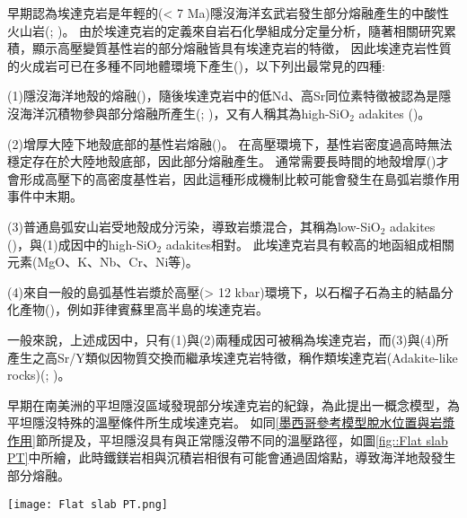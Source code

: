 早期認為埃達克岩是年輕的(< 7 Ma)隱沒海洋玄武岩發生部分熔融產生的中酸性火山岩(\citealp{defant1990derivation}; \citealp{peacock1994partial})。
由於埃達克岩的定義來自岩石化學組成分定量分析，隨著相關研究累積，顯示高壓變質基性岩的部分熔融皆具有埃達克岩的特徵，
因此埃達克岩性質的火成岩可已在多種不同地體環境下產生(\citealp{martin2005overview})，以下列出最常見的四種:

(1)隱沒海洋地殼的熔融(\citealp{defant1990derivation})，隨後埃達克岩中的低Nd、高Sr同位素特徵被認為是隱沒海洋沉積物參與部分熔融所產生(\citealp{stern1996role}; \citealp{gomez2003temporal})，又有人稱其為high-SiO$_2$ adakites (\citealp{martin2005overview})。

(2)增厚大陸下地殼底部的基性岩熔融(\citealp{kay1996magmatic})。
在高壓環境下，基性岩密度過高時無法穩定存在於大陸地殼底部，因此部分熔融產生。
通常需要長時間的地殼增厚(\citealp{kay2002magmatism})才會形成高壓下的高密度基性岩，因此這種形成機制比較可能會發生在島弧岩漿作用事件中末期。

(3)普通島弧安山岩受地殼成分污染，導致岩漿混合，其稱為low-SiO$_2$ adakites (\citealp{martin2005overview})，與(1)成因中的high-SiO$_2$ adakites相對。
此埃達克岩具有較高的地函組成相關元素(MgO、K、Nb、Cr、Ni等)。

(4)來自一般的島弧基性岩漿於高壓(> 12 kbar)環境下，以石榴子石為主的結晶分化產物(\citealp{moyen2009high})，例如菲律賓蘇里高半島的埃達克岩。

一般來說，上述成因中，只有(1)與(2)兩種成因可被稱為埃達克岩，而(3)與(4)所產生之高Sr/Y類似因物質交換而繼承埃達克岩特徵，稱作類埃達克岩(Adakite-like rocks)(\citealp{kay2002magmatism}; \citealp{goss2013andean})。

早期在南美洲的平坦隱沒區域發現部分埃達克岩的紀錄，\citealp{Gutscher2000Bcan}為此提出一概念模型，為平坦隱沒特殊的溫壓條件所生成埃達克岩。
如同\ref{墨西哥參考模型脫水位置與岩漿作用}節所提及，平坦隱沒具有與正常隱沒帶不同的溫壓路徑，如圖\ref{fig::Flat slab PT}中所繪，此時鐵鎂岩相與沉積岩相很有可能會通過固熔點，導致海洋地殼發生部分熔融。

\begin{figure*}[ht!]
    \centering
    \texttt{[image: Flat slab PT.png]}
    \caption[隱沒板塊頂部可能的溫壓路徑圖，摘自\citealp{Gutscher2000Bcan}]{隱沒板塊頂部可能的溫壓路徑圖，摘自\citealp{Gutscher2000Bcan}。Ec—榴輝岩(eclogite)，Am—角閃岩(amphibolite)，Ga—石榴石(garnet)，Hb—角閃石(hornblende)。
    圓形為正常隱沒帶中的溫壓路徑，菱形與正方形則為平坦隱沒的溫壓路徑。其中，灰色底部分為隱沒板塊可能的部分熔融區。
    }
    \label{fig::Flat slab PT}
\end{figure*}

